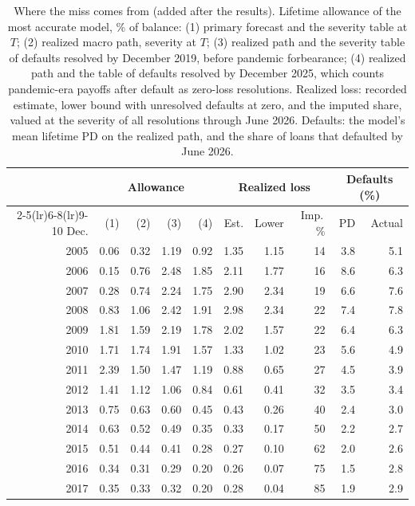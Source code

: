 \begin{table}[t]\centering\footnotesize
\caption{Where the miss comes from (added after the results). Lifetime allowance of the most accurate model, \% of balance: (1) primary forecast and the severity table at $T$; (2) realized macro path, severity at $T$; (3) realized path and the severity table of defaults resolved by December 2019, before pandemic forbearance; (4) realized path and the table of defaults resolved by December 2025, which counts pandemic-era payoffs after default as zero-loss resolutions. Realized loss: recorded estimate, lower bound with unresolved defaults at zero, and the imputed share, valued at the severity of all resolutions through June 2026. Defaults: the model's mean lifetime PD on the realized path, and the share of loans that defaulted by June 2026.}\label{tab:decomp}
\setlength{\tabcolsep}{3.5pt}
\begin{tabular}{rrrrrrrrrr}\toprule
& \multicolumn{4}{c}{Allowance} & \multicolumn{3}{c}{Realized loss} & \multicolumn{2}{c}{Defaults (\%)} \\
\cmidrule(lr){2-5}\cmidrule(lr){6-8}\cmidrule(lr){9-10}
Dec. & (1) & (2) & (3) & (4) & Est. & Lower & Imp.\,\% & PD & Actual \\ \midrule
2005 & 0.06 & 0.32 & 1.19 & 0.92 & 1.35 & 1.15 & 14 & 3.8 & 5.1 \\
2006 & 0.15 & 0.76 & 2.48 & 1.85 & 2.11 & 1.77 & 16 & 8.6 & 6.3 \\
2007 & 0.28 & 0.74 & 2.24 & 1.75 & 2.90 & 2.34 & 19 & 6.6 & 7.6 \\
2008 & 0.83 & 1.06 & 2.42 & 1.91 & 2.98 & 2.34 & 22 & 7.4 & 7.8 \\
2009 & 1.81 & 1.59 & 2.19 & 1.78 & 2.02 & 1.57 & 22 & 6.4 & 6.3 \\
2010 & 1.71 & 1.74 & 1.91 & 1.57 & 1.33 & 1.02 & 23 & 5.6 & 4.9 \\
2011 & 2.39 & 1.50 & 1.47 & 1.19 & 0.88 & 0.65 & 27 & 4.5 & 3.9 \\
2012 & 1.41 & 1.12 & 1.06 & 0.84 & 0.61 & 0.41 & 32 & 3.5 & 3.4 \\
2013 & 0.75 & 0.63 & 0.60 & 0.45 & 0.43 & 0.26 & 40 & 2.4 & 3.0 \\
2014 & 0.63 & 0.52 & 0.49 & 0.35 & 0.33 & 0.17 & 50 & 2.2 & 2.7 \\
2015 & 0.51 & 0.44 & 0.41 & 0.28 & 0.27 & 0.10 & 62 & 2.0 & 2.6 \\
2016 & 0.34 & 0.31 & 0.29 & 0.20 & 0.26 & 0.07 & 75 & 1.5 & 2.8 \\
2017 & 0.35 & 0.33 & 0.32 & 0.20 & 0.28 & 0.04 & 85 & 1.9 & 2.9 \\
\bottomrule\end{tabular}
\end{table}
